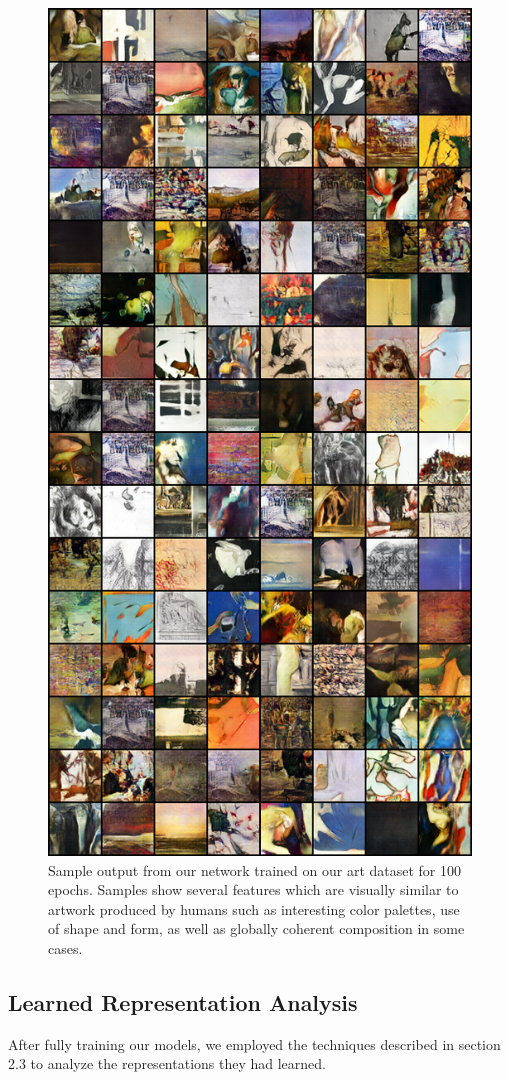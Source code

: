\documentclass[10pt,twocolumn,letterpaper]{article}
\begin{document}
\begin{figure}[t]
	\begin{center}
		\includegraphics[width=0.775\linewidth]{art_samples.png}
	\end{center}
	\caption{Sample output from our network trained on our art dataset for 100 epochs. Samples show several features which are visually similar to artwork produced by humans such as interesting color palettes, use of shape and form, as well as globally coherent composition in some cases.}
	\label{fig:long}
	\label{fig:onecol}
\end{figure}

\subsection{Learned Representation Analysis}
After fully training our models, we employed the techniques described in section 2.3 to analyze the representations they had learned. 
\end{document}
